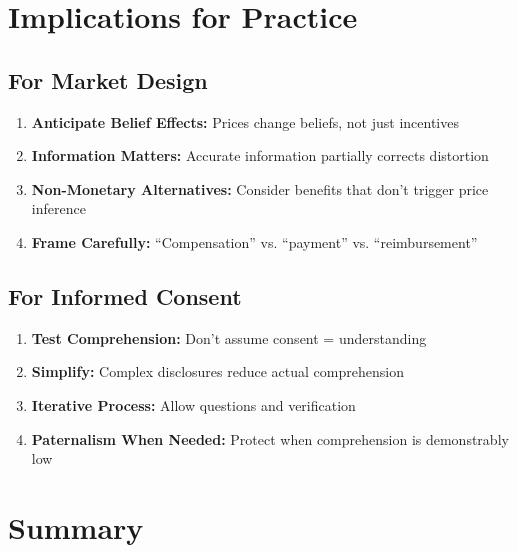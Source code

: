 \section{Implications for Practice}

\subsection{For Market Design}

\begin{enumerate}
    \item \textbf{Anticipate Belief Effects:} Prices change beliefs, not just incentives
    \item \textbf{Information Matters:} Accurate information partially corrects distortion
    \item \textbf{Non-Monetary Alternatives:} Consider benefits that don't trigger price inference
    \item \textbf{Frame Carefully:} ``Compensation'' vs. ``payment'' vs. ``reimbursement''
\end{enumerate}

\subsection{For Informed Consent}

\begin{enumerate}
    \item \textbf{Test Comprehension:} Don't assume consent = understanding
    \item \textbf{Simplify:} Complex disclosures reduce actual comprehension
    \item \textbf{Iterative Process:} Allow questions and verification
    \item \textbf{Paternalism When Needed:} Protect when comprehension is demonstrably low
\end{enumerate}

\section{Summary}

